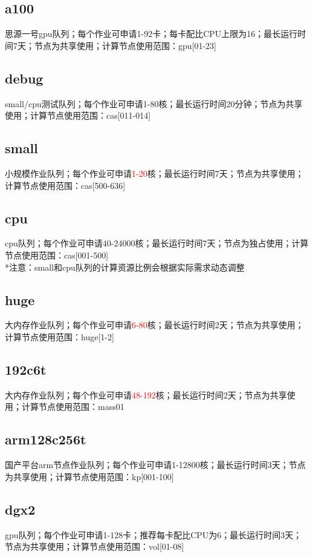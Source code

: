 \documentclass[cn, 12pt, hang, black, chinese]{elegantbook}
\begin{document}
\subsection*{a100}
思源一号gpu队列；每个作业可申请1-92卡；每卡配比CPU上限为16；最长运行时间7天；节点为共享使用；计算节点使用范围：gpu[01-23]

\subsection*{debug}
small/cpu测试队列；每个作业可申请1-80核；最长运行时间20分钟；节点为共享使用；计算节点使用范围：cas[011-014]

\subsection*{small}
小规模作业队列；每个作业可申请\textcolor{red}{1-20}核；最长运行时间7天；节点为共享使用；计算节点使用范围：cas[500-636]

\subsection*{cpu}
cpu队列；每个作业可申请40-24000核；最长运行时间7天；节点为独占使用；计算节点使用范围：cas[001-500]\\*注意：small和cpu队列的计算资源比例会根据实际需求动态调整

\subsection*{huge}
大内存作业队列；每个作业可申请\textcolor{red}{6-80}核；最长运行时间2天；节点为共享使用；计算节点使用范围：huge[1-2]

\subsection*{192c6t}
大内存作业队列；每个作业可申请\textcolor{red}{48-192}核；最长运行时间2天；节点为共享使用；计算节点使用范围：mass01

\subsection*{arm128c256t}
国产平台arm节点作业队列；每个作业可申请1-12800核；最长运行时间3天；节点为共享使用；计算节点使用范围：kp[001-100]

\subsection*{dgx2}
gpu队列；每个作业可申请1-128卡；推荐每卡配比CPU为6；最长运行时间3天；节点为共享使用；计算节点使用范围：vol[01-08]
\end{document}
